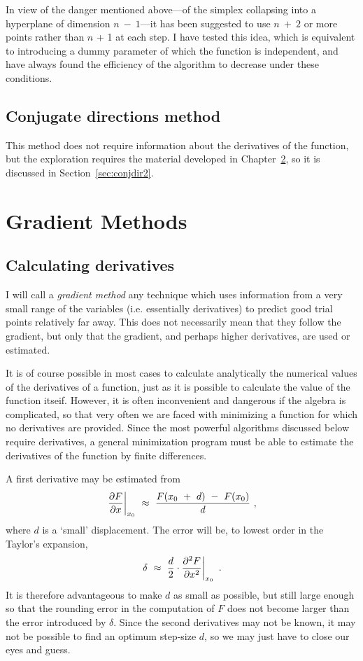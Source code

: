      In view of the danger mentioned above---of the simplex collapsing
into a hyperplane of dimension $n~-~1$---it has been suggested to use $n~+~2$
or more points rather than $n$ + 1 at each step.  I have tested this idea,
which is equivalent to introducing a dummy parameter of which the
function is independent, and have always found the efficiency of the
algorithm to decrease under these conditions.
 
\section{Conjugate directions method}
 
This method does not require information about the derivatives of the function, 
but the
exploration requires the material
developed in Chapter~\ref{sec:gradmeth}, so it is discussed in 
Section~\ref{sec:conjdir2}.
 
\chapter{Gradient Methods}
\label{sec:gradmeth}
 
\section{Calculating derivatives}
 
     I will call a {\em gradient method} any technique which uses information
from a very small range of the variables (i.e. essentially derivatives)
to predict good trial points relatively far away. This does not necessarily
 mean that they follow the gradient, but only that the gradient, and
perhaps higher derivatives, are used or estimated.
 
     It is of course possible in most cases to calculate analytically the
numerical values of the derivatives of a function, just as it is possible
to calculate the value of the function itseif.  However, it is often
inconvenient and dangerous if the algebra is complicated, so that very
often we are faced with minimizing a function for which no derivatives
are provided. Since the most powerful algorithms discussed below require
derivatives, a general minimization program must be able to estimate the
derivatives of the function by finite differences.
 
     A first derivative may be estimated from
$$\left .{\partial F\over \partial x}\right|_{x_{0}}~\approx~{F(x_0~+~d)~-~F(x_{0})\over
d}~,$$ where $d$ is a `small' displacement.  The error will be, to lowest
order in the Taylor's expansion,
$$\left .\delta~\approx~{d\over 2} \cdot {\partial^{2}F\over \partial x^{2}}\right|_{x_{0}}~.$$
 It is therefore advantageous to make $d$ as small as possible, but still
large enough so that the rounding error in the computation of $F$ does not
become larger than the error introduced by $\delta$. Since the second derivatives may not be known,
it may not be possible to find an optimum step-size $d$, so we may just have to close our eyes and
guess.
 
